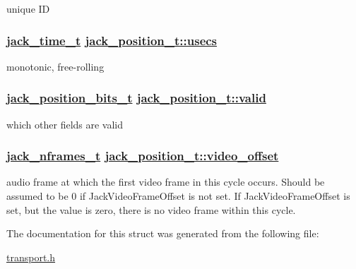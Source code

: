 unique ID \hypertarget{structjack__position__t_edb03a0d7fde02d2a6f0470bdce6e92a}{
\subsubsection[usecs]{\setlength{\rightskip}{0pt plus 5cm}\hyperlink{types_8h_71d1a1356a36ae1f9e60b4361e21905e}{jack\_\-time\_\-t} \hyperlink{structjack__position__t_edb03a0d7fde02d2a6f0470bdce6e92a}{jack\_\-position\_\-t::usecs}}}
\label{structjack__position__t_edb03a0d7fde02d2a6f0470bdce6e92a}


monotonic, free-rolling \hypertarget{structjack__position__t_9f7d0ee82b6a6ca7ddeae841f3253059}{
\subsubsection[valid]{\setlength{\rightskip}{0pt plus 5cm}\hyperlink{transport_8h_2c97bd120f26ce62aba5c2692b4482b7}{jack\_\-position\_\-bits\_\-t} \hyperlink{structjack__position__t_9f7d0ee82b6a6ca7ddeae841f3253059}{jack\_\-position\_\-t::valid}}}
\label{structjack__position__t_9f7d0ee82b6a6ca7ddeae841f3253059}


which other fields are valid \hypertarget{structjack__position__t_c512bcb7a53efd8cb8fe7874ff9a8a81}{
\subsubsection[video\_\-offset]{\setlength{\rightskip}{0pt plus 5cm}\hyperlink{types_8h_fe9972a13782c1e282747fdb4bc46f9c}{jack\_\-nframes\_\-t} \hyperlink{structjack__position__t_c512bcb7a53efd8cb8fe7874ff9a8a81}{jack\_\-position\_\-t::video\_\-offset}}}
\label{structjack__position__t_c512bcb7a53efd8cb8fe7874ff9a8a81}


audio frame at which the first video frame in this cycle occurs. Should be assumed to be 0 if Jack\-Video\-Frame\-Offset is not set. If Jack\-Video\-Frame\-Offset is set, but the value is zero, there is no video frame within this cycle. 

The documentation for this struct was generated from the following file:\begin{CompactItemize}
\item 
\hyperlink{transport_8h}{transport.h}\end{CompactItemize}
